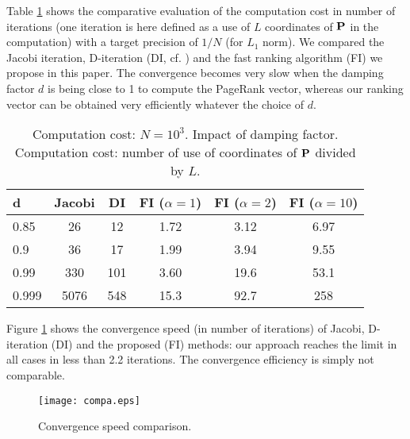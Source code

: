 \documentclass[conference]{IEEEtran}
\def\Pb{\bold{P}}
\begin{document}
\begin{psfrags}
Table \ref{tab:1000} shows the comparative evaluation of the computation cost in number of
iterations (one iteration is here defined as a use of $L$ coordinates of $\Pb$ in the computation)
with a target precision of $1/N$ (for $L_1$ norm).
We compared the Jacobi iteration, D-iteration (DI, cf. \cite{d-algo}) and the fast ranking algorithm
(FI) we propose in this paper. The convergence becomes very slow when the damping factor $d$ is being
close to 1 to compute the PageRank vector, whereas our ranking vector can be obtained very
efficiently whatever the choice of $d$.
\begin{table}
\begin{center}
\begin{tabular}{|l|ccccc|}
\hline
d        & Jacobi  & DI   & FI ($\alpha=1$) & FI ($\alpha=2$) & FI ($\alpha=10$)\\
\hline
0.85     & 26      & 12   & 1.72 & 3.12 & 6.97\\
0.9      & 36      & 17   & 1.99 & 3.94 & 9.55\\
0.99     & 330     & 101  & 3.60 & 19.6 & 53.1\\
0.999    & 5076    & 548  & 15.3 & 92.7 & 258\\
\hline
\end{tabular}\caption{Computation cost: $N=10^3$. Impact of damping factor. Computation cost: number of use of coordinates of $\Pb$ divided by $L$.}\label{tab:1000}
\end{center}
\end{table}

Figure \ref{fig:compa} shows the convergence speed (in number of iterations) of Jacobi, D-iteration (DI) and
the proposed (FI) methods: our approach reaches the limit in all cases in less than 2.2 iterations.
The convergence efficiency is simply not comparable.
\begin{figure}[htbp]
\centering
\texttt{[image: compa.eps]}
\caption{Convergence speed comparison.}
\label{fig:compa}
\end{figure}


\end{psfrags}
\end{document}
